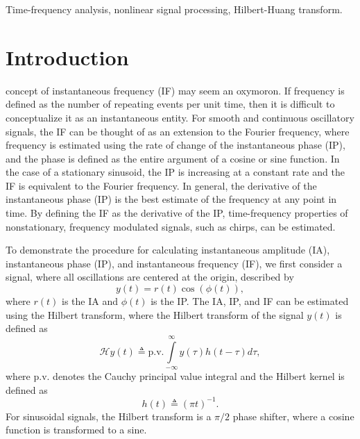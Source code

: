 \documentclass[11pt,draftcls,onecolumn]{IEEEtran}
\begin{document}
\begin{IEEEkeywords}
Time-frequency analysis, nonlinear signal processing, Hilbert-Huang transform.
\end{IEEEkeywords}

\IEEEpeerreviewmaketitle

\section{Introduction}
 concept of instantaneous frequency (IF) may seem an oxymoron. If frequency is defined as the number of repeating events per unit time, then it is difficult to conceptualize it as an instantaneous entity. For smooth and continuous oscillatory signals, the IF can be thought of as an extension to the Fourier frequency, where frequency is estimated using the rate of change of the instantaneous phase (IP), and the phase is defined as the entire argument of a cosine or sine function. In the case of a stationary sinusoid, the IP is increasing at a constant rate and the IF is equivalent to the Fourier frequency. In general, the derivative of the instantaneous phase (IP) is the best estimate of the frequency at any point in time. By defining the IF as the derivative of the IP, time-frequency properties of nonstationary, frequency modulated signals, such as chirps, can be estimated. 

To demonstrate the procedure for calculating instantaneous amplitude (IA), instantaneous phase (IP), and instantaneous frequency (IF), we first consider a signal, where all oscillations are centered at the origin, described by
\begin{equation}
	y(t) = r(t)\cos(\phi(t)),
\end{equation}
where $r(t)$ is the IA and $\phi(t)$ is the IP. The IA, IP, and IF can be estimated using the Hilbert transform, where the Hilbert transform of the signal $y(t)$ is defined as
\begin{equation}\label{eq:HilbertTransform}
	\mathcal{H}y\left( t \right) \triangleq \textrm{p.v.}\int\limits_{ - \infty }^\infty  {y\left( \tau  \right)h\left( {t - \tau } \right)} d\tau,
\end{equation}
where $\textrm{p.v.}$ denotes the Cauchy principal value integral and the Hilbert kernel is defined as
\begin{equation}\label{eq:HilbertKernel}
	h\left( t \right) \triangleq {\left( {\pi t} \right)^{ - 1}}.
\end{equation}
For sinusoidal signals, the Hilbert transform is a $\pi/2$ phase shifter, where a cosine function is transformed to a sine.
\end{document}
